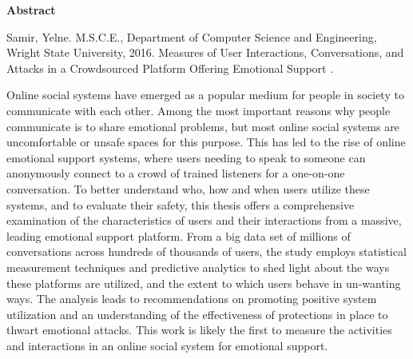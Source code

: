 \newpage


\clearpage\thispagestyle{empty}
\thispagestyle{plain}
\setcounter{page}{3}


\begin{center}
{\normalfont\Large\bfseries Abstract}
\end{center}

\singlespacing
{\noindent
Samir, Yelne.  %
M.S.C.E., Department of Computer Science and Engineering,
Wright State University,
2016.                           %
Measures of User Interactions, Conversations, and Attacks in a Crowdsourced Platform Offering Emotional Support
.} %

\par\vskip 1.5cm

\doublespacing

Online social systems have emerged as a popular medium for people in society to communicate with each other. Among the most important reasons why people communicate is to share emotional problems, but most online social systems are uncomfortable or unsafe spaces for this purpose. This has led to the rise of online emotional support systems, where users needing to speak to someone can anonymously connect to a crowd of trained listeners for a one-on-one conversation. To better understand who, how and when users utilize these systems, and to evaluate their safety, this thesis offers a comprehensive examination of the characteristics of users and their interactions from a massive, leading emotional support platform. From a big data set of millions of conversations across hundreds of thousands of users, the study employs statistical measurement techniques and predictive analytics to shed light about the ways these platforms are utilized, and the extent to which users behave in un-wanting ways. The analysis leads to recommendations on promoting positive system utilization and an understanding of the effectiveness of protections in place to thwart emotional attacks. This work is likely the first to measure the activities and interactions in an online social system for emotional support. 


\restoregeometry
